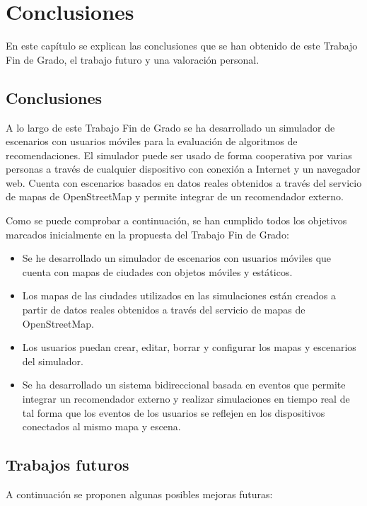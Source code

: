 \chapter{Conclusiones}

En este capítulo se explican las conclusiones que se han obtenido de este Trabajo Fin de Grado, el trabajo futuro y una valoración personal.

\section{Conclusiones}

A lo largo de este Trabajo Fin de Grado se ha desarrollado un simulador de escenarios con usuarios móviles para la evaluación de algoritmos de recomendaciones. El simulador puede ser usado de forma cooperativa por varias personas a través de cualquier dispositivo con conexión a Internet y un navegador web. Cuenta con escenarios basados en datos reales obtenidos a través del servicio de mapas de OpenStreetMap y permite integrar de un recomendador externo.

Como se puede comprobar a continuación, se han cumplido todos los objetivos marcados inicialmente en la propuesta del Trabajo Fin de Grado:
\begin{itemize}
	\item Se he desarrollado un simulador de escenarios con usuarios móviles que cuenta con mapas de ciudades con objetos móviles y estáticos.
	\item Los mapas de las ciudades utilizados en las simulaciones están creados a partir de datos reales obtenidos a través del servicio de mapas de OpenStreetMap.
	\item Los usuarios puedan crear, editar, borrar y configurar los mapas y escenarios del simulador.
	\item Se ha desarrollado un sistema bidireccional basada en eventos que permite integrar un recomendador externo y realizar simulaciones en tiempo real de tal forma que los eventos de los usuarios se reflejen en los dispositivos conectados al mismo mapa y escena.
\end{itemize}

\section{Trabajos futuros}

A continuación se proponen algunas posibles mejoras futuras:

